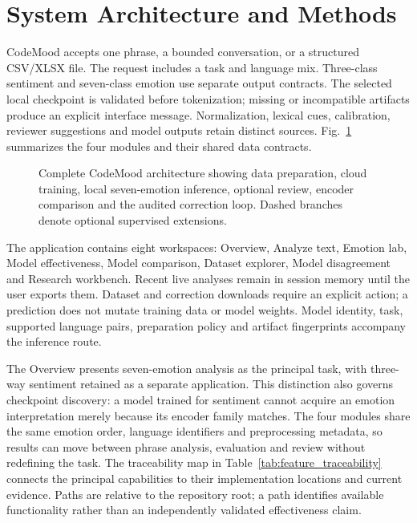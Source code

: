 \documentclass[journal]{IEEEtran}
\begin{document}
\section{System Architecture and Methods}

CodeMood accepts one phrase, a bounded conversation, or a structured CSV/XLSX file. The request includes a task and language mix. Three-class sentiment and seven-class emotion use separate output contracts. The selected local checkpoint is validated before tokenization; missing or incompatible artifacts produce an explicit interface message. Normalization, lexical cues, calibration, reviewer suggestions and model outputs retain distinct sources. Fig.~\ref{fig:master_architecture} summarizes the four modules and their shared data contracts.

\begin{figure}[p]
\centering
\resizebox{.96\textwidth}{!}{}
\caption{Complete CodeMood architecture showing data preparation, cloud training, local seven-emotion inference, optional review, encoder comparison and the audited correction loop. Dashed branches denote optional supervised extensions.}\label{fig:master_architecture}
\end{figure}


The application contains eight workspaces: Overview, Analyze text, Emotion lab, Model effectiveness, Model comparison, Dataset explorer, Model disagreement and Research workbench. Recent live analyses remain in session memory until the user exports them. Dataset and correction downloads require an explicit action; a prediction does not mutate training data or model weights. Model identity, task, supported language pairs, preparation policy and artifact fingerprints accompany the inference route.

The Overview presents seven-emotion analysis as the principal task, with three-way sentiment retained as a separate application. This distinction also governs checkpoint discovery: a model trained for sentiment cannot acquire an emotion interpretation merely because its encoder family matches. The four modules share the same emotion order, language identifiers and preprocessing metadata, so results can move between phrase analysis, evaluation and review without redefining the task. The traceability map in Table~\ref{tab:feature_traceability} connects the principal capabilities to their implementation locations and current evidence. Paths are relative to the repository root; a path identifies available functionality rather than an independently validated effectiveness claim.
\end{document}
